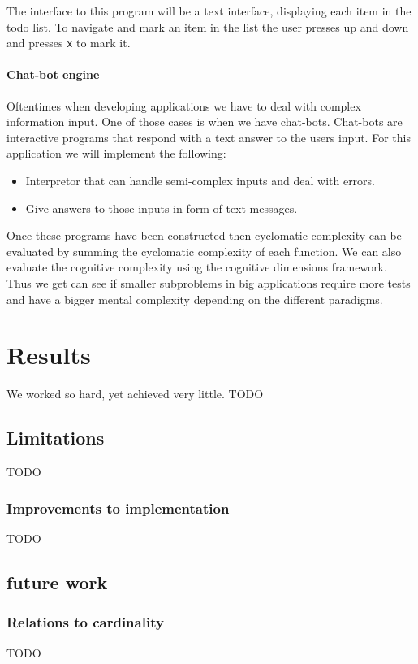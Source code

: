 \documentclass[12pt]{report}
\theoremstyle{definition}
\theoremstyle{theorem}
\begin{document}
The interface to this program will be a text interface, displaying each item in
the todo list. To navigate and mark an item in the list the user presses up and
down and presses \texttt{x} to mark it.

\subsubsection*{Chat-bot engine}

Oftentimes when developing applications we have to deal with complex information
input. One of those cases is when we have chat-bots. Chat-bots are interactive
programs that respond with a text answer to the users input. For this
application we will implement the following:

\begin{itemize}
    \item Interpretor that can handle semi-complex inputs and deal with errors.
    \item Give answers to those inputs in form of text messages.
\end{itemize}

\noindent Once these programs have been constructed then cyclomatic complexity
can be evaluated by summing the cyclomatic complexity of each function. We can
also evaluate the cognitive complexity using the cognitive dimensions framework.
Thus we get can see if smaller subproblems in big applications require more
tests and have a bigger mental complexity depending on the different paradigms.

\chapter{Results}\label{results}
We worked so hard, yet achieved very little. TODO

\section{Limitations}\label{limitations}

TODO

\subsection{Improvements to implementation}
TODO

\section{future work}
\subsection{Relations to cardinality}
TODO



\end{document}
